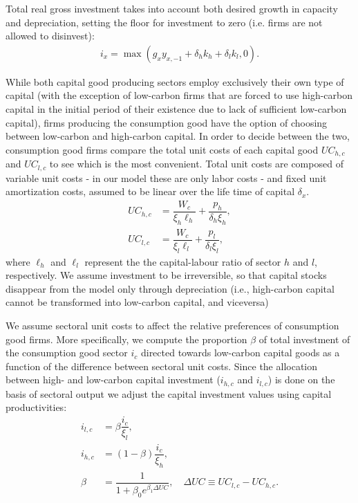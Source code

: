 \documentclass[authoryear]{article}
\begin{document}
Total real gross investment takes into account both desired growth in capacity and depreciation, setting the floor for investment to zero (i.e. firms are not allowed to disinvest):
\begin{align}
i_x = \max\left(g_x y_{x,-1} + \delta_h k_h + \delta_l k_l,0\right).
\end{align}

While both capital good producing sectors employ exclusively their own type of capital (with the exception of low-carbon firms that are forced to use high-carbon capital in the initial period of their existence due to lack of sufficient low-carbon capital), firms producing the consumption good have the option of choosing between low-carbon and high-carbon capital. In order to decide between the two, consumption good firms compare the total unit costs of each capital good $UC_{h,c}$ and $UC_{l,c}$ to see which is the most convenient. Total unit costs are composed of variable unit costs - in our model these are only labor costs - and fixed unit amortization costs, assumed to be linear over the life time of capital $\delta_x$.
\begin{align}
UC_{h,c} &= \dfrac{W_c}{\xi_h \ell_h} + \dfrac{p_h}{\delta_h \xi_h},\\
UC_{l,c} &= \dfrac{W_c}{\xi_l \ell_l} + \dfrac{p_l}{\delta_l \xi_l},
\end{align}
where $\ell_h$ and $\ell_l$ represent the the capital-labour ratio of sector $h$ and $l$, respectively. We assume investment to be irreversible, so that capital stocks disappear from the model only through depreciation (i.e., high-carbon capital cannot be transformed into low-carbon capital, and viceversa)

We assume sectoral unit costs to affect the relative preferences of consumption good firms. More specifically, we compute the proportion $\beta$ of total investment of the consumption good sector $i_c$ directed towards low-carbon capital goods as a function of the difference between sectoral unit costs. Since the allocation between high- and low-carbon capital investment ($i_{h,c}$ and $i_{l,c}$) is done on the basis of sectoral output we adjust the capital investment values using capital productivities:
\begin{align}
i_{l,c} &= \beta \dfrac{i_c}{\xi_l},\\
i_{h,c} &= (1-\beta) \dfrac{i_c}{\xi_h},\\
\beta &= \dfrac{1}{1+\beta_0 e^{\beta_1 \Delta UC}},\quad \Delta UC \equiv UC_{l,c}-UC_{h,c}.
\end{align}
\end{document}
